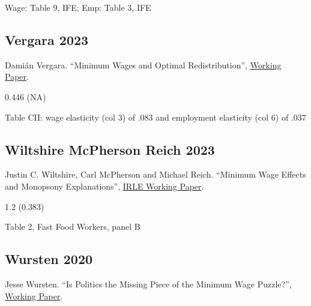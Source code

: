  Wage: Table 9, IFE; Emp: Table 3, IFE

\subsection*{Vergara 2023}
\vspace{-0.7em}

\noindent Damián Vergara. ``Minimum Wages and Optimal Redistribution'', \href{https://dvergarad.github.io/files/JMP_DV.pdf}{Working Paper}.

\vspace{0.7em}

 0.446 (NA)

\vspace{0.7em}

 Table CII: wage elasticity (col 3) of .083 and employment elasticity (col 6) of .037

\subsection*{Wiltshire McPherson Reich 2023}
\vspace{-0.7em}

\noindent Justin C. Wiltshire, Carl McPherson and Michael Reich. ``Minimum Wage Effects and Monopsony Explanations'', \href{https://irle.berkeley.edu/wp-content/uploads/2023/09/Minimum-Wage-Effects-and-Monopsony-Explanations.pdf}{IRLE Working Paper}.

\vspace{0.7em}

 1.2 (0.383)

\vspace{0.7em}

 Table 2, Fast Food Workers, panel B

\subsection*{Wursten 2020}
\vspace{-0.7em}

\noindent Jesse Wursten. ``Is Politics the Missing Piece of the Minimum Wage Puzzle?'', \href{http://dx.doi.org/10.13140/RG.2.2.14177.20329}{Working Paper}.

\vspace{0.7em}

